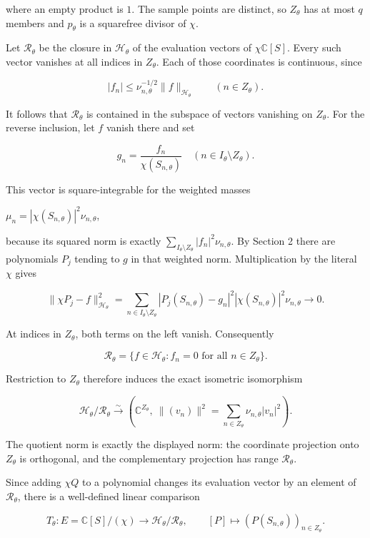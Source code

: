 where an empty product is \(1\). The sample points are distinct, so \(Z_\theta\) has at most \(q\) members and \(p_\theta\) is a squarefree divisor of \(\chi\).

Let \(\mathcal R_\theta\) be the closure in \(\mathcal H_\theta\) of the evaluation vectors of \(\chi \mathbb C[S]\). Every such vector vanishes at all indices in \(Z_\theta\). Each of those coordinates is continuous, since

\[
|f_n|\le\nu_{n,\theta}^{-1/2}\|f\|_{\mathcal H_\theta}
\qquad(n\in Z_\theta).
\tag{CQ15}
\]

It follows that \(\mathcal R_\theta\) is contained in the subspace of vectors vanishing on \(Z_\theta\). For the reverse inclusion, let \(f\) vanish there and set

\[
g_n=\frac{f_n}{\chi(S_{n,\theta})}
\quad(n\in I_\theta\setminus Z_\theta).
\tag{CQ16}
\]

This vector is square-integrable for the weighted masses

\(\mu_n = |\chi(S_{n,\theta})|^2 \nu_{n,\theta}\),

because its squared norm is exactly \(\sum_{I_\theta\setminus Z_\theta} |f_n|^2 \nu_{n,\theta}\). By Section 2 there are polynomials \(P_j\) tending to \(g\) in that weighted norm. Multiplication by the literal \(\chi\) gives

\[
\|\chi P_j-f\|_{\mathcal H_\theta}^2
=\sum_{n\in I_\theta\setminus Z_\theta}
|P_j(S_{n,\theta})-g_n|^2
|\chi(S_{n,\theta})|^2\nu_{n,\theta}\longrightarrow0.
\tag{CQ17}
\]

At indices in \(Z_\theta\), both terms on the left vanish. Consequently

\[
\mathcal R_\theta
=\{f\in\mathcal H_\theta:f_n=0\text{ for all }n\in Z_\theta\}.
\tag{CQ18}
\]

Restriction to \(Z_\theta\) therefore induces the exact isometric isomorphism

\[
\mathcal H_\theta/\mathcal R_\theta
\xrightarrow{\sim}
\left(\mathbb C^{Z_\theta},
\ \|(v_n)\|^2=\sum_{n\in Z_\theta}\nu_{n,\theta}|v_n|^2\right).
\tag{CQ19}
\]

The quotient norm is exactly the displayed norm: the coordinate projection onto \(Z_\theta\) is orthogonal, and the complementary projection has range \(\mathcal R_\theta\).

Since adding \(\chi Q\) to a polynomial changes its evaluation vector by an element of \(\mathcal R_\theta\), there is a well-defined linear comparison

\[
T_\theta:E=\mathbb C[S]/(\chi)
\longrightarrow\mathcal H_\theta/\mathcal R_\theta,
\qquad
[P]\longmapsto(P(S_{n,\theta}))_{n\in Z_\theta}.
\tag{CQ20}
\]

